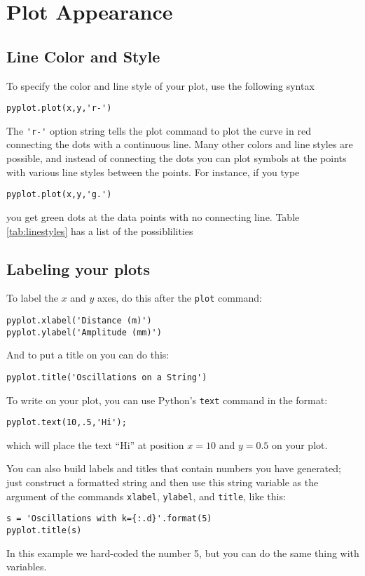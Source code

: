 \section{Plot Appearance}

\subsection*{Line Color and Style}

To specify the color and line style of your plot, use the following syntax
\begin{Verbatim}
pyplot.plot(x,y,'r-')
\end{Verbatim}
The \verb|'r-'| option string tells the plot command to plot the
curve in red connecting the dots with a continuous line. Many other
colors and line styles are possible, and instead of connecting the
dots you can plot symbols at the points with various line styles
between the points. For instance, if you type
\begin{Verbatim}
pyplot.plot(x,y,'g.')
\end{Verbatim}
you get green dots at the data points with no connecting line.  Table
\ref{tab:linestyles} has a list of the possiblilities


\subsection*{Labeling your plots}
To label the $x$ and $y$ axes, do this after the {\tt plot} command:
\begin{Verbatim}
pyplot.xlabel('Distance (m)')
pyplot.ylabel('Amplitude (mm)')
\end{Verbatim}
And to put a title on you can do this:
\begin{Verbatim}
pyplot.title('Oscillations on a String')
\end{Verbatim}
  To write on your
plot, you can use Python's {\tt text} command in the format:
\begin{Verbatim}
pyplot.text(10,.5,'Hi');
\end{Verbatim}
which will place the text ``Hi'' at position $x=10$ and $y=0.5$ on
your plot.

You can also build labels and titles that contain numbers you have
generated; just construct a formatted string and then use this string
variable as the argument of the commands {\tt xlabel}, {\tt ylabel},
and {\tt title}, like this:
\begin{Verbatim}
s = 'Oscillations with k={:.d}'.format(5)
pyplot.title(s)
\end{Verbatim}
In this example we hard-coded the number 5, but you can do the same
thing with variables.


